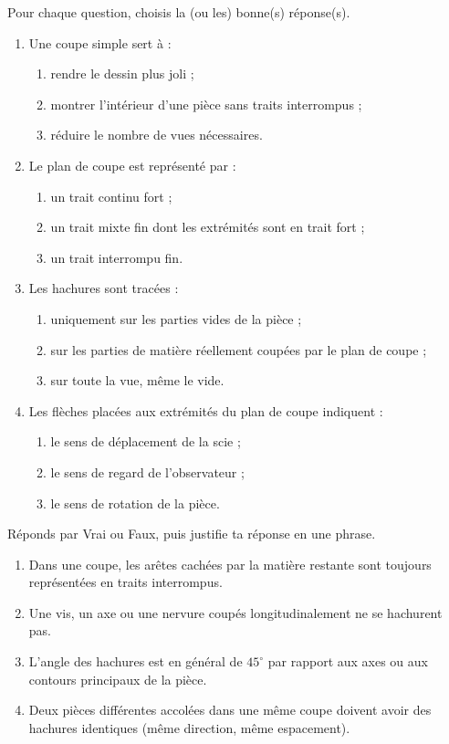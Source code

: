 \documentclass[11pt]{article}
\begin{document}
\begin{exercice}
Pour chaque question, choisis la (ou les) bonne(s) réponse(s).
\begin{enumerate}
\item Une coupe simple sert à :
\begin{enumerate}
\item rendre le dessin plus joli ;
\item montrer l'intérieur d'une pièce sans traits interrompus ;
\item réduire le nombre de vues nécessaires.
\end{enumerate}
\item Le plan de coupe est représenté par :
\begin{enumerate}
\item un trait continu fort ;
\item un trait mixte fin dont les extrémités sont en trait fort ;
\item un trait interrompu fin.
\end{enumerate}
\item Les hachures sont tracées :
\begin{enumerate}
\item uniquement sur les parties vides de la pièce ;
\item sur les parties de matière réellement coupées par le plan de coupe ;
\item sur toute la vue, même le vide.
\end{enumerate}
\item Les flèches placées aux extrémités du plan de coupe indiquent :
\begin{enumerate}
\item le sens de déplacement de la scie ;
\item le sens de regard de l'observateur ;
\item le sens de rotation de la pièce.
\end{enumerate}
\end{enumerate}
\end{exercice}

\begin{exercice}
Réponds par Vrai ou Faux, puis justifie ta réponse en une phrase.
\begin{enumerate}
\item Dans une coupe, les arêtes cachées par la matière restante sont toujours représentées en traits interrompus.
\item Une vis, un axe ou une nervure coupés longitudinalement ne se hachurent pas.
\item L'angle des hachures est en général de $45^{\circ}$ par rapport aux axes ou aux contours principaux de la pièce.
\item Deux pièces différentes accolées dans une même coupe doivent avoir des hachures identiques (même direction, même espacement).
\end{enumerate}
\end{exercice}
\end{document}
